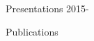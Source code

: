 \documentclass[a4paper]{article}
\begin{document}
\begin{rubrique}{Presentations 2015-}

\end{rubrique}

\pagebreak
\begin{rubrique}{Publications}
\end{rubrique}
\end{document}
